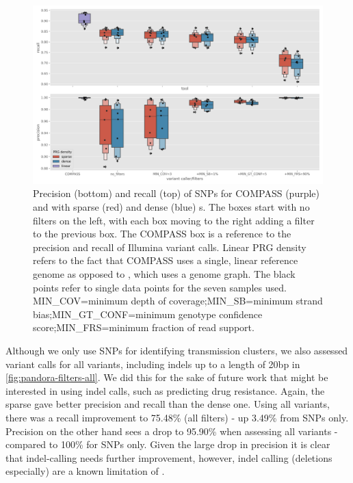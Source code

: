 \begin{figure}
\begin{center}
\includegraphics[width=0.90\columnwidth]{Chapter2/Figs/pandora-precision-recall-filters-snps.png}
\caption{{Precision (bottom) and recall (top) of SNPs for COMPASS (purple) and \pandora{} with sparse (red) and dense (blue) \prg{}s. The \pandora{} boxes start with no filters on the left, with each box moving to the right adding a filter to the previous box. The COMPASS box is a reference to the precision and recall of Illumina variant calls. Linear PRG density refers to the fact that COMPASS uses a single, linear reference genome as opposed to \pandora{}, which uses a genome graph. The black points refer to single data points for the seven samples used. MIN\_COV=minimum depth of coverage;MIN\_SB=minimum strand bias;MIN\_GT\_CONF=minimum genotype confidence score;MIN\_FRS=minimum fraction of read support.
{\label{fig:pandora-filters-snps}}%
}}
\end{center}
\end{figure}

Although we only use SNPs for identifying transmission clusters, we also assessed \pandora{} variant calls for all variants, including indels up to a length of 20bp in \autoref{fig:pandora-filters-all}.  We did this for the sake of future work that might be interested in using \pandora{} indel calls, such as predicting drug resistance. Again, the sparse \prg{} gave better precision and recall than the dense one. Using all variants, there was a recall improvement to 75.48\% (all filters) - up 3.49\% from SNPs only. Precision on the other hand sees a drop to 95.90\% when assessing all variants - compared to 100\% for SNPs only. Given the large drop in precision it is clear that \pandora{} indel-calling needs further improvement, however, indel calling (deletions especially) are a known limitation of \ont{} \cite{jain2018,wick2019}.

